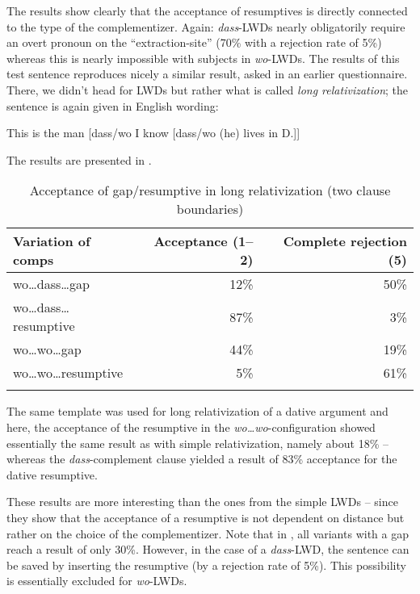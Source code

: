 \documentclass[output=paper]{langsci/langscibook}
\begin{document}
The results show clearly that the acceptance of resumptives is directly
connected to the type of the complementizer. Again: \emph{dass}-\glspl{LWD} nearly
obligatorily require an overt pronoun on the \enquote{extraction-site} (70\% with a
rejection rate of 5\%) whereas this is nearly impossible with subjects in
\emph{wo}-\glspl{LWD}. The results of this test sentence reproduces nicely a similar
result, asked in an earlier questionnaire. There, we didn’t head for \glspl{LWD} but
rather what is called \emph{long relativization}; the sentence is again given in
English wording:\largerpage

\ea
	 This is the man [dass/wo I know [dass/wo (he) lives in D.]]
\z

\noindent The results are presented in .

\begin{table}
\begin{tabular}{lrr}
\lsptoprule
{Variation of comps} & {Acceptance (1--2)} & {Complete rejection (5)}\\
\midrule
{wo\dots{}dass\dots{}gap} & {12\%} & {50\%}\\
{wo\dots{}dass\dots{}resumptive} & {87\%} & {3\%}\\
{wo\dots{}wo\dots{}gap} & {44\%} & {19\%}\\
{wo\dots{}wo\dots{}resumptive} & {5\%} & {61\%}\\
\lspbottomrule
\end{tabular}
\caption{Acceptance of gap/resumptive in long relativization (two clause
boundaries)}\label{tab:36.3}
\end{table}

The same template was used for long relativization of a dative argument and
here, the acceptance of the resumptive in the \textit{wo\dots{}wo}-configuration showed
essentially the same result as with simple relativization, namely about 18\% --
where\-as the \emph{dass}-complement clause yielded a result of 83\% acceptance
for the dative resumptive.

These results are more interesting than the ones from the simple \glspl{LWD} -- since
they show that the acceptance of a resumptive is not dependent on distance but
rather on the choice of the complementizer. Note that in , 
all variants with a gap reach a result of only 30\%. However, in the
case of a \emph{dass}-\gls{LWD}, the sentence can be saved by inserting the
resumptive (by a rejection rate of 5\%). This possibility is essentially
excluded for \emph{wo}-\glspl{LWD}.
\end{document}
